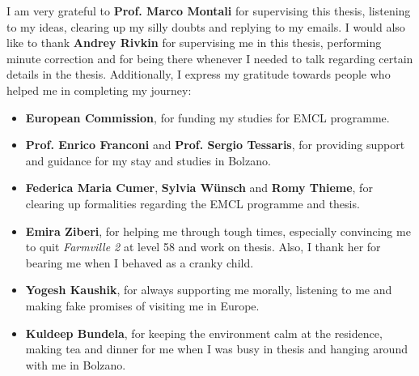 \acknowledgments
I am very grateful to \textbf{Prof. Marco Montali} for supervising this thesis, listening to my ideas, clearing up my silly doubts and replying to my emails. I would also like to thank \textbf{Andrey Rivkin} for supervising me in this thesis, performing minute correction and for being there whenever I needed to talk regarding certain details in the thesis. Additionally, I express my gratitude towards people who helped me in completing my journey:
\begin{itemize}
	\item \textbf{European Commission}, for funding my studies for EMCL programme.
	\item \textbf{Prof. Enrico Franconi} and \textbf{Prof. Sergio Tessaris}, for providing support and guidance for my stay and studies in Bolzano.
	\item \textbf{Federica Maria Cumer}, \textbf{Sylvia W{\"u}nsch} and \textbf{Romy Thieme}, for clearing up formalities regarding the EMCL programme and thesis.
	\item \textbf{Emira Ziberi}, for helping me through tough times, especially convincing me to quit \textit{Farmville 2} at level 58 and work on thesis. Also, I thank her for bearing me when I behaved as a cranky child.
	\item \textbf{Yogesh Kaushik}, for always supporting me morally, listening to me and making fake promises of visiting me in Europe.
	\item \textbf{Kuldeep Bundela}, for keeping the environment calm at the residence, making tea and dinner for me when I was busy in thesis and hanging around with me in Bolzano.
\end{itemize}


